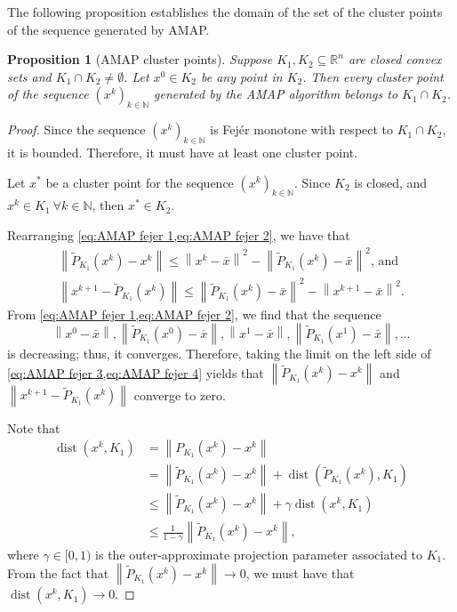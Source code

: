 \documentclass[smallextended,numbook,nospthms]{svjour3}
\theoremstyle{plain}
\newtheorem{proposition}[theorem]{Proposition}
\theoremstyle{definition}
\def\RR{\mathds R}
\def\NN{\mathds N}
\DeclareMathOperator{\dist}{dist}
\begin{document}
The following proposition establishes the domain of the set of the cluster points of the sequence generated by AMAP.
\begin{proposition}[AMAP cluster points]\label{prop:AMAP cluster}
	Suppose $K_{1},K_{2} \subseteq \RR^{n}$ are closed convex sets and $K_{1} \cap K_{2} \neq \emptyset$. Let $x^{0} \in K_{2}$ be any point in $K_{2}$. Then every cluster point of the sequence $\left(x^{k}\right)_{k \in \NN}$ generated by the AMAP algorithm belongs to $K_{1} \cap K_{2}$.
\end{proposition}
	\begin{proof}
	Since the sequence $\left(x^{k}\right)_{k \in \NN}$ is Fejér monotone with respect to $K_{1} \cap K_{2}$, it is bounded. Therefore, it must have at least one cluster point.
	
	Let $x^{*}$ be a cluster point for the sequence $\left(x^{k}\right)_{k \in \NN}$. Since $K_{2}$ is closed, and $x^{k} \in K_{1} \ \forall k \in \NN$, then $x^{*} \in K_{2}$.
	
	Rearranging \cref{eq:AMAP fejer 1,eq:AMAP fejer 2}, we have that
	\begin{align}
	\left\|\tilde{P}_{K_{1}}\left(x^{k}\right)-x^{k}\right\| \leq  \left\|x^{k}-\bar{x}\right\|^{2} - \left\|\tilde{P}_{K_{1}}\left(x^{k}\right)-\bar{x}\right\|^{2} \label{eq:AMAP fejer 3} \text{, and} \\
	\left\|x^{k+1}-\tilde{P}_{K_{1}}\left(x^{k}\right)\right\| \leq \left\|\tilde{P}_{K_{1}}\left(x^{k}\right)-\bar{x}\right\|^{2} - \left\|x^{k+1}-\bar{x}\right\|^{2}. \label{eq:AMAP fejer 4}
	\end{align}
	From \cref{eq:AMAP fejer 1,eq:AMAP fejer 2}, we find that the sequence
	$$
	\left\|x^{0}-\bar{x}\right\|,\left\|\tilde{P}_{K_{1}}\left(x^{0}\right)-\bar{x}\right\|,\left\|x^{1}-\bar{x}\right\|,\left\|\tilde{P}_{K_{1}}\left(x^{1}\right)-\bar{x}\right\|, \ldots
	$$
	is decreasing; thus, it converges. Therefore, taking the limit on the left side of \cref{eq:AMAP fejer 3,eq:AMAP fejer 4} yields that $\left\|\tilde{P}_{K_{1}}\left(x^{k}\right)-x^{k}\right\|$ and $\left\|x^{k+1}-\tilde{P}_{K_{1}}\left(x^{k}\right)\right\|$ converge to zero.
	
	Note that
	\begin{align}			
		\dist(x^{k},K_{1})&=\left\|P_{K_{1}}(x^{k})-x^{k}\right\|\\
		&=\left\|\tilde{P}_{K_{1}}\left(x^{k}\right)-x^{k}\right\|+\dist(\tilde{P}_{K_{1}}\left(x^{k}\right),K_{1})\\
		&\leq\left\|\tilde{P}_{K_{1}}\left(x^{k}\right)-x^{k}\right\|+\gamma\dist(x^{k},K_{1}) \\
		&\leq \frac{1}{1-\gamma}\left\|\tilde{P}_{K_{1}}\left(x^{k}\right)-x^{k}\right\|, 
	\end{align}
where $\gamma \in [0,1)$ is the outer-approximate projection parameter associated to $K_{1}$. From the fact that $\left\|\tilde{P}_{K_{1}}\left(x^{k}\right)-x^{k}\right\| \rightarrow 0$, we must have that $\dist(x^{k},K_{1}) \rightarrow 0$.


\end{proof}
\end{document}
